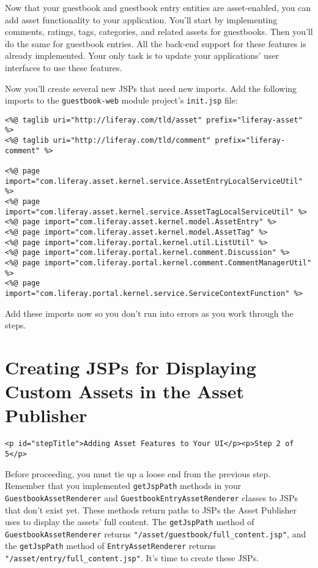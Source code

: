 Now that your guestbook and guestbook entry entities are asset-enabled,
you can add asset functionality to your application. You'll start by
implementing comments, ratings, tags, categories, and related assets for
guestbooks. Then you'll do the same for guestbook entries. All the
back-end support for these features is already implemented. Your only
task is to update your applications' user interfaces to use these
features.

Now you'll create several new JSPs that need new imports. Add the
following imports to the \texttt{guestbook-web} module project's
\texttt{init.jsp} file:

\begin{verbatim}
<%@ taglib uri="http://liferay.com/tld/asset" prefix="liferay-asset" %>
<%@ taglib uri="http://liferay.com/tld/comment" prefix="liferay-comment" %>

<%@ page import="com.liferay.asset.kernel.service.AssetEntryLocalServiceUtil" %>
<%@ page import="com.liferay.asset.kernel.service.AssetTagLocalServiceUtil" %>
<%@ page import="com.liferay.asset.kernel.model.AssetEntry" %>
<%@ page import="com.liferay.asset.kernel.model.AssetTag" %>
<%@ page import="com.liferay.portal.kernel.util.ListUtil" %>
<%@ page import="com.liferay.portal.kernel.comment.Discussion" %>
<%@ page import="com.liferay.portal.kernel.comment.CommentManagerUtil" %>
<%@ page import="com.liferay.portal.kernel.service.ServiceContextFunction" %>
\end{verbatim}

Add these imports now so you don't run into errors as you work through
the steps.

\chapter{Creating JSPs for Displaying Custom Assets in the Asset
Publisher}\label{creating-jsps-for-displaying-custom-assets-in-the-asset-publisher}

\begin{verbatim}
<p id="stepTitle">Adding Asset Features to Your UI</p><p>Step 2 of 5</p>
\end{verbatim}

Before proceeding, you must tie up a loose end from the previous step.
Remember that you implemented \texttt{getJspPath} methods in your
\texttt{GuestbookAssetRenderer} and \texttt{GuestbookEntryAssetRenderer}
classes to JSPs that don't exist yet. These methods return paths to JSPs
the Asset Publisher uses to display the assets' full content. The
\texttt{getJspPath} method of \texttt{GuestbookAssetRenderer} returns
\texttt{"/asset/guestbook/full\_content.jsp"}, and the
\texttt{getJspPath} method of \texttt{EntryAssetRenderer} returns
\texttt{"/asset/entry/full\_content.jsp"}. It's time to create these
JSPs.

